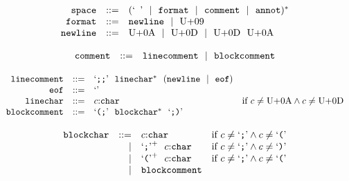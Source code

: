 \vspace{1ex}

$$
\begin{array}[t]{@{}lrrl@{}l@{}l@{}l@{}}
& {\mathtt{space}} & ::= & {(\mbox{‘\texttt{ }’} ~~|~~ {\mathtt{format}} ~~|~~ {\mathtt{comment}} ~~|~~ {\mathtt{annot}})^\ast} \\
& {\mathtt{format}} & ::= & {\mathtt{newline}} ~~|~~ \mathrm{U{+}09} \\
& {\mathtt{newline}} & ::= & \mathrm{U{+}0A} ~~|~~ \mathrm{U{+}0D} ~~|~~ \mathrm{U{+}0D}~~\mathrm{U{+}0A} \\
\end{array}
$$

\vspace{1ex}

$$
\begin{array}[t]{@{}lrrl@{}l@{}l@{}l@{}}
& {\mathtt{comment}} & ::= & {\mathtt{linecomment}} ~~|~~ {\mathtt{blockcomment}} \\
\end{array}
$$

\vspace{1ex}

$$
\begin{array}[t]{@{}lrrl@{}l@{}l@{}l@{}}
& {\mathtt{linecomment}} & ::= & \mbox{‘\texttt{;;}’}~~{{\mathtt{linechar}}^\ast}~~({\mathtt{newline}} ~~|~~ {\mathtt{eof}}) \\
& {\mathtt{eof}} & ::= & \mbox{‘\texttt{}’} \\
& {\mathtt{linechar}} & ::= & c{:}{\mathtt{char}} & \quad \mbox{if}~ c \neq \mathrm{U{+}0A} \land c \neq \mathrm{U{+}0D} \\
& {\mathtt{blockcomment}} & ::= & \mbox{‘\texttt{{(};}’}~~{{\mathtt{blockchar}}^\ast}~~\mbox{‘\texttt{;{)}}’} \\
\end{array}
$$

\vspace{1ex}

$$
\begin{array}[t]{@{}lrrl@{}l@{}l@{}l@{}}
& {\mathtt{blockchar}} & ::= & c{:}{\mathtt{char}} & \quad \mbox{if}~ c \neq \mbox{‘\texttt{;}’} \land c \neq \mbox{‘\texttt{{(}}’} \\
& & | & {\mbox{‘\texttt{;}’}^{+}}~~c{:}{\mathtt{char}} & \quad \mbox{if}~ c \neq \mbox{‘\texttt{;}’} \land c \neq \mbox{‘\texttt{{)}}’} \\
& & | & {\mbox{‘\texttt{{(}}’}^{+}}~~c{:}{\mathtt{char}} & \quad \mbox{if}~ c \neq \mbox{‘\texttt{;}’} \land c \neq \mbox{‘\texttt{{(}}’} \\
& & | & {\mathtt{blockcomment}} \\
\end{array}
$$

